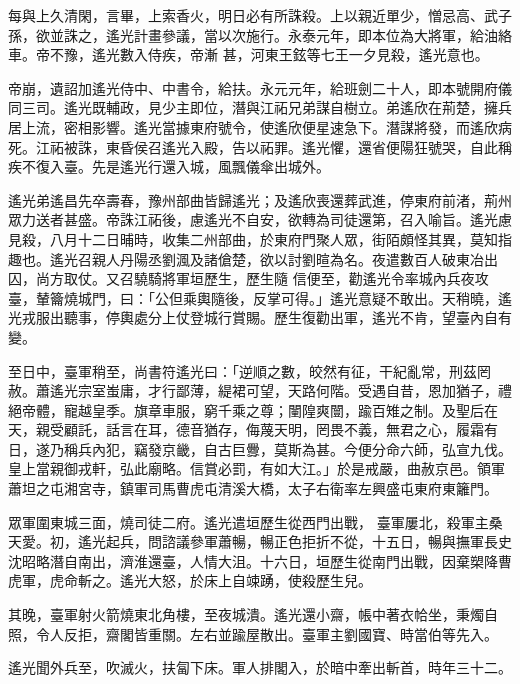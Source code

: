 \begin{pinyinscope}
 每與上久清閑，言畢，上索香火，明日必有所誅殺。上以親近單少，憎忌高、武子孫，欲並誅之，遙光計畫參議，當以次施行。永泰元年，即本位為大將軍，給油絡車。帝不豫，遙光數入侍疾，帝漸
 甚，河東王鉉等七王一夕見殺，遙光意也。



 帝崩，遺詔加遙光侍中、中書令，給扶。永元元年，給班劍二十人，即本號開府儀同三司。遙光既輔政，見少主即位，潛與江祏兄弟謀自樹立。弟遙欣在荊楚，擁兵居上流，密相影響。遙光當據東府號令，使遙欣便星速急下。潛謀將發，而遙欣病死。江祏被誅，東昏侯召遙光入殿，告以祏罪。遙光懼，還省便陽狂號哭，自此稱疾不復入臺。先是遙光行還入城，風飄儀傘出城外。



 遙光弟遙昌先卒壽春，豫州部曲皆歸遙光；及遙欣喪還葬武進，停東府前渚，荊州眾力送者甚盛。帝誅江祏後，慮遙光不自安，欲轉為司徒還第，召入喻旨。遙光慮見殺，八月十二日晡時，收集二州部曲，於東府門聚人眾，街陌頗怪其異，莫知指趣也。遙光召親人丹陽丞劉渢及諸傖楚，欲以討劉暄為名。夜遣數百人破東冶出囚，尚方取仗。又召驍騎將軍垣歷生，歷生隨
 信便至，勸遙光令率城內兵夜攻臺，輦籥燒城門，曰：「公但乘輿隨後，反掌可得。」遙光意疑不敢出。天稍曉，遙光戎服出聽事，停輿處分上仗登城行賞賜。歷生復勸出軍，遙光不肯，望臺內自有變。



 至日中，臺軍稍至，尚書符遙光曰：「逆順之數，皎然有征，干紀亂常，刑茲罔赦。蕭遙光宗室蚩庸，才行鄙薄，緹裙可望，天路何階。受遇自昔，恩加猶子，禮絕帝體，寵越皇季。旗章車服，窮千乘之尊；闉隍爽闓，踰百雉之制。及聖后在天，親受顧託，話言在耳，德音猶存，侮蔑天明，罔畏不義，無君之心，履霜有日，遂乃稱兵內犯，竊發京畿，自古巨釁，莫斯為甚。今便分命六師，弘宣九伐。皇上當親御戎軒，弘此廟略。信賞必罰，有如大江。」於是戒嚴，曲赦京邑。領軍蕭坦之屯湘宮寺，鎮軍司馬曹虎屯清溪大橋，太子右衛率左興盛屯東府東籬門。



 眾軍圍東城三面，燒司徒二府。遙光遣垣歷生從西門出戰，
 臺軍屢北，殺軍主桑天愛。初，遙光起兵，問諮議參軍蕭暢，暢正色拒折不從，十五日，暢與撫軍長史沈昭略潛自南出，濟淮還臺，人情大沮。十六日，垣歷生從南門出戰，因棄槊降曹虎軍，虎命斬之。遙光大怒，於床上自竦踴，使殺歷生兒。



 其晚，臺軍射火箭燒東北角樓，至夜城潰。遙光還小齋，帳中著衣帢坐，秉燭自照，令人反拒，齋閣皆重關。左右並踰屋散出。臺軍主劉國寶、時當伯等先入。



 遙光聞外兵至，吹滅火，扶匐下床。軍人排閣入，於暗中牽出斬首，時年三十二。




\end{pinyinscope}

